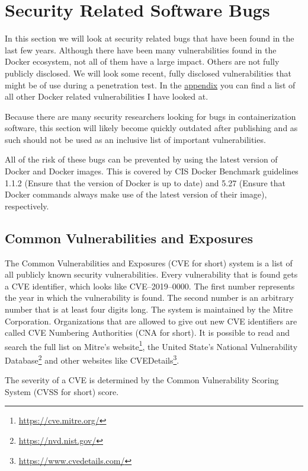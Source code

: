 \section{Security Related Software Bugs}\label{section:bugs}
In this section we will look at security related bugs that have been found in the last few years. Although there have been many vulnerabilities found in the Docker ecosystem, not all of them have a large impact. Others are not fully publicly disclosed. We will look some recent, fully disclosed vulnerabilities that might be of use during a penetration test. In the \hyperref[appendix:CVE-List]{appendix} you can find a list of all other Docker related vulnerabilities I have looked at.

\hfill

Because there are many security researchers looking for bugs in containerization software, this section will likely become quickly outdated after publishing and as such should not be used as an inclusive list of important vulnerabilities.

\hfill

All of the risk of these bugs can be prevented by using the latest version of Docker and Docker images. This is covered by CIS Docker Benchmark guidelines 1.1.2 (Ensure that the version of Docker is up to date) and 5.27 (Ensure that Docker commands always make use of the latest version of their image), respectively.

\subsection*{Common Vulnerabilities and Exposures}
The Common Vulnerabilities and Exposures (CVE for short) system is a list of all publicly known security vulnerabilities. Every vulnerability that is found gets a CVE identifier, which looks like CVE--2019--0000. The first number represents the year in which the vulnerability is found. The second number is an arbitrary number that is at least four digits long. The system is maintained by the Mitre Corporation. Organizations that are allowed to give out new CVE identifiers are called CVE Numbering Authorities (CNA for short). It is possible to read and search the full list on Mitre's website\footnote{\url{https://cve.mitre.org/}}, the United State's National Vulnerability Database\footnote{\url{https://nvd.nist.gov/}} and other websites like CVEDetails\footnote{\url{https://www.cvedetails.com/}}.

The severity of a CVE is determined by the Common Vulnerability Scoring System (CVSS for short) score.








